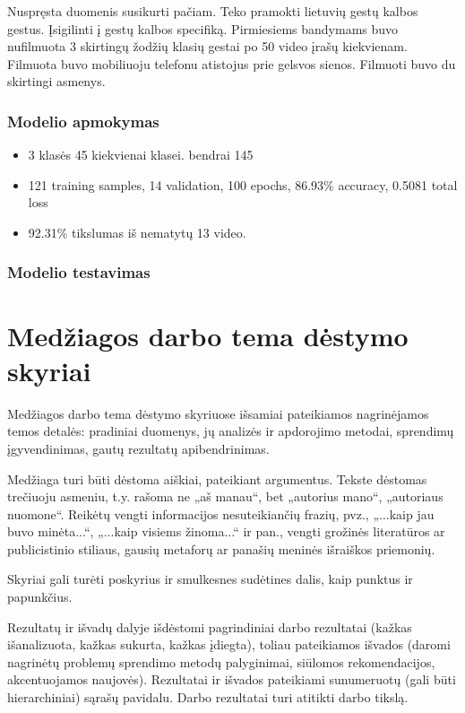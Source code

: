 \documentclass{VUMIFPSbakalaurinis}
\begin{document}
Nuspręsta duomenis susikurti pačiam. Teko pramokti lietuvių gestų kalbos gestus. Įsigilinti į gestų kalbos specifiką. Pirmiesiems bandymams buvo nufilmuota 3 skirtingų žodžių klasių gestai po 50 video įrašų kiekvienam. Filmuota buvo mobiliuoju telefonu atistojus prie gelsvos sienos. Filmuoti buvo du skirtingi asmenys.


\subsubsection{Modelio apmokymas}

\begin{itemize}
	\item 3 klasės 45 kiekvienai klasei. bendrai 145
	\item 121 training samples, 14 validation, 100 epochs, 86.93\% accuracy, 0.5081 total loss
	\item 92.31\% tikslumas iš nematytų 13 video.
\end{itemize}

\subsubsection{Modelio testavimas}


\section{Medžiagos darbo tema dėstymo skyriai}
Medžiagos darbo tema dėstymo skyriuose išsamiai pateikiamos nagrinėjamos temos
detalės: pradiniai duomenys, jų analizės ir apdorojimo metodai, sprendimų
įgyvendinimas, gautų rezultatų apibendrinimas.

Medžiaga turi būti dėstoma aiškiai, pateikiant argumentus. Tekste dėstomas
trečiuoju asmeniu, t.y. rašoma ne „aš manau“, bet „autorius mano“, „autoriaus
nuomone“. Reikėtų vengti informacijos nesuteikiančių frazių, pvz., „...kaip jau
buvo minėta...“, „...kaip visiems žinoma...“ ir pan., vengti grožinės
literatūros ar publicistinio stiliaus, gausių metaforų ar panašių meninės
išraiškos priemonių.

Skyriai gali turėti poskyrius ir smulkesnes sudėtines dalis, kaip punktus ir
papunkčius.


Rezultatų ir išvadų dalyje išdėstomi pagrindiniai darbo rezultatai (kažkas
išanalizuota, kažkas sukurta, kažkas įdiegta), toliau pateikiamos išvados
(daromi nagrinėtų problemų sprendimo metodų palyginimai, siūlomos
rekomendacijos, akcentuojamos naujovės). Rezultatai ir išvados pateikiami
sunumeruotų (gali būti hierarchiniai) sąrašų pavidalu. Darbo rezultatai turi
atitikti darbo tikslą.
\end{document}
